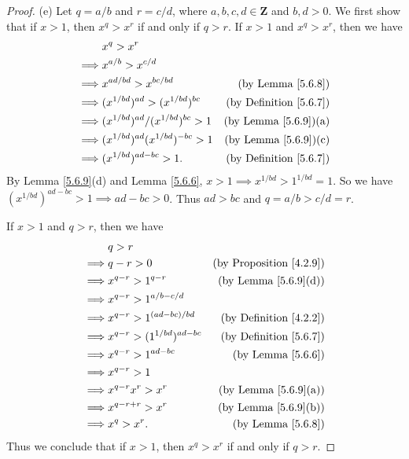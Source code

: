 \begin{proof}{(e)}
    Let \(q = a / b\) and \(r = c / d\), where \(a, b, c, d \in \mathbf{Z}\) and \(b, d > 0\).
    We first show that if \(x > 1\), then \(x^q > x^r\) if and only if \(q > r\).
    If \(x > 1\) and \(x^q > x^r\), then we have
    \begin{align*}
                 & x^q > x^r                                                                      \\
        \implies & x^{a / b} > x^{c / d}                                                          \\
        \implies & x^{ad / bd} > x^{bc / bd}                 & \text{(by Lemma \ref{5.6.8})}      \\
        \implies & (x^{1 / bd})^{ad} > (x^{1 / bd})^{bc}     & \text{(by Definition \ref{5.6.7})} \\
        \implies & (x^{1 / bd})^{ad} / (x^{1 / bd})^{bc} > 1 & \text{(by Lemma \ref{5.6.9})(a)}   \\
        \implies & (x^{1 / bd})^{ad} (x^{1 / bd})^{-bc} > 1  & \text{(by Lemma \ref{5.6.9})(c)}   \\
        \implies & (x^{1 / bd})^{ad - bc} > 1.               & \text{(by Definition \ref{5.6.7})}
    \end{align*}
    By Lemma \ref{5.6.9}(d) and Lemma \ref{5.6.6}, \(x > 1 \implies x^{1 / bd} > 1^{1 / bd} = 1\).
    So we have \((x^{1 / bd})^{ad - bc} > 1 \implies ad - bc > 0\).
    Thus \(ad > bc\) and \(q = a / b > c / d = r\).

    If \(x > 1\) and \(q > r\), then we have
    \begin{align*}
                 & q > r                                                                    \\
        \implies & q - r > 0                          & \text{(by Proposition \ref{4.2.9})} \\
        \implies & x^{q - r} > 1^{q - r}              & \text{(by Lemma \ref{5.6.9}(d))}    \\
        \implies & x^{q - r} > 1^{a / b - c / d}                                            \\
        \implies & x^{q - r} > 1^{(ad - bc) / bd}     & \text{(by Definition \ref{4.2.2})}  \\
        \implies & x^{q - r} > (1^{1 / bd})^{ad - bc} & \text{(by Definition \ref{5.6.7})}  \\
        \implies & x^{q - r} > 1^{ad - bc}            & \text{(by Lemma \ref{5.6.6})}       \\
        \implies & x^{q - r} > 1                                                            \\
        \implies & x^{q - r} x^r > x^r                & \text{(by Lemma \ref{5.6.9}(a))}    \\
        \implies & x^{q - r + r} > x^r                & \text{(by Lemma \ref{5.6.9}(b))}    \\
        \implies & x^q > x^r.                         & \text{(by Lemma \ref{5.6.8})}
    \end{align*}
    Thus we conclude that if \(x > 1\), then \(x^q > x^r\) if and only if \(q > r\).


\end{proof}
